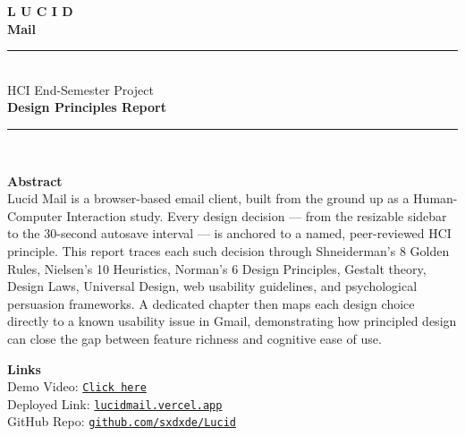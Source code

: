 \documentclass[12pt,a4paper]{report}
\begin{document}
\onehalfspacing

\begin{titlepage}
  \pagecolor{dark}
  \color{white}
  \centering
  \vspace*{0.5cm}
  {\fontsize{48}{56}\selectfont\bfseries
    \textcolor[HTML]{4285F4}{L}%
    \textcolor[HTML]{EA4335}{U}%
    \textcolor[HTML]{FBBC04}{C}%
    \textcolor[HTML]{34A853}{I}%
    \textcolor[HTML]{4285F4}{D}%
  }\\[0.3cm]
  {\Large\bfseries\color{white!90!dark} Mail}\\[0.6cm]
  {\normalsize\color{white!60!dark}
    \rule{0.4\textwidth}{0.4pt}\\[0.3cm]
    HCI End-Semester Project\\
    \textbf{Design Principles Report}\\
    \rule{0.4\textwidth}{0.4pt}
  }\\[0.8cm]
  \begin{tcolorbox}[
    enhanced, sharp corners,
    colback=white!5!dark, colframe=white!15!dark,
    width=0.72\textwidth,
    left=14pt, right=14pt, top=10pt, bottom=10pt,
  ]
    \centering
    \color{white!80!dark}
    {\normalsize\bfseries Abstract}\\[6pt]
    {\footnotesize
      Lucid Mail is a browser-based email client, built from the ground up as a
      Human-Computer Interaction study. Every design decision — from the resizable
      sidebar to the 30-second autosave interval — is anchored to a named,
      peer-reviewed HCI principle. This report traces each such decision through
      Shneiderman's 8 Golden Rules, Nielsen's 10 Heuristics, Norman's 6 Design
      Principles, Gestalt theory, Design Laws, Universal Design, web usability
      guidelines, and psychological persuasion frameworks. A dedicated chapter
      then maps each design choice directly to a known usability issue in Gmail,
      demonstrating how principled design can close the gap between feature
      richness and cognitive ease of use.
    }
  \end{tcolorbox}

  \vspace{0.5cm}

  \begin{tcolorbox}[
    enhanced, sharp corners,
    colback=white!5!dark, colframe=white!15!dark,
    width=0.72\textwidth,
    left=14pt, right=14pt, top=10pt, bottom=10pt,
  ]
    \centering\color{white!80!dark}
    {\normalsize\bfseries Links}\\[6pt]
    {\small\textcolor{white!60!dark}{Demo Video:}}\quad
    \href{https://drive.google.com/file/d/1RwdGfb7ZN_OwO-fjVCp8hDLtwpG0of7S/view?usp=sharing}{\texttt{\small\textcolor{white!70!dark}{Click here}}}\\[4pt]
    {\small\textcolor{white!60!dark}{Deployed Link:}}\quad
    \href{https://lucidmail.vercel.app/}{\texttt{\small\textcolor{white!70!dark}{lucidmail.vercel.app}}}\\[4pt]
    {\small\textcolor{white!60!dark}{GitHub Repo:}}\quad
    \href{https://github.com/sxdxde/Lucid}{\texttt{\small\textcolor{white!70!dark}{github.com/sxdxde/Lucid}}}
  \end{tcolorbox}


\end{titlepage}
\end{document}
